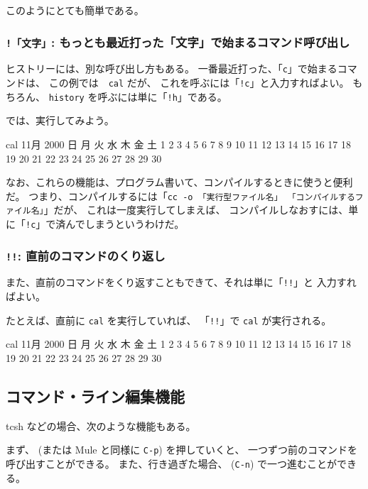 このようにとても簡単である。

\subsubsection{\texttt{!「文字」}: もっとも最近打った「文字」で始まるコマンド呼び出し}

ヒストリーには、別な呼び出し方もある。
一番最近打った、「\texttt{c}」で始まるコマンドは、
この例では　\texttt{cal} だが、
これを呼ぶには「\texttt{!c}」と入力すればよい。
もちろん、 \texttt{history} を呼ぶには単に「\texttt{!h}」である。

では、実行してみよう。

\begin{progls}
cal
     11月 2000
日 月 火 水 木 金 土
          1  2  3  4
 5  6  7  8  9 10 11
12 13 14 15 16 17 18
19 20 21 22 23 24 25
26 27 28 29 30

%
\end{progls}

なお、これらの機能は、プログラム書いて、コンパイルするときに使うと便利だ。
つまり、コンパイルするには「\texttt{cc -o 「実行型ファイル名」 「コンパイルするファイル名」}」だが、
これは一度実行してしまえば、
コンパイルしなおすには、単に「\texttt{!c}」で済んでしまうというわけだ。

\subsubsection{\texttt{!!}: 直前のコマンドのくり返し}

また、直前のコマンドをくり返すこともできて、それは単に「\texttt{!!}」と
入力すればよい。

たとえば、直前に \texttt{cal} を実行していれば、
「\texttt{!!}」で \texttt{cal} が実行される。

\begin{progls}
cal
     11月 2000
日 月 火 水 木 金 土
          1  2  3  4
 5  6  7  8  9 10 11
12 13 14 15 16 17 18
19 20 21 22 23 24 25
26 27 28 29 30

%
\end{progls}

\newpage

\subsection{コマンド・ライン編集機能}

tcsh などの場合、次のような機能もある。

まず、 (または Mule と同様に \texttt{C-p}) を押していくと、
一つずつ前のコマンドを呼び出すことができる。
また、行き過ぎた場合、 (\texttt{C-n}) で一つ進むことができる。

